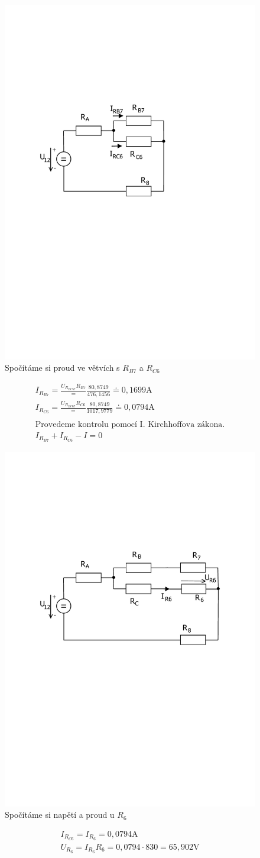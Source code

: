 	\begin{figure}[H]
		\center\includegraphics[width=0.6\linewidth]{obr/1_9}
		\caption*{Spočítáme si proud ve větvích s $R_{B7}$ a  $R_{C6}$}
	\end{figure}
	\begin{gather*}
		I_{R_{B7}} = \frac{U_{R_{BC67}}{R_{B7}}} = \frac{80,8749}{476,1456} \doteq 0,1699 \text{A} \\
		I_{R_{C6}} = \frac{U_{R_{BC67}}{R_{C6}}} = \frac{80,8749}{1017,9779} \doteq 0,0794 \text{A} \\
		\\
		\text{Provedeme kontrolu pomocí I. Kirchhoffova zákona.}  \\
		I_{R_{B7}} + I_{R_{C6}} - I  =  0 
	\end{gather*}

	\begin{figure}[H]
		\center\includegraphics[width=0.6\linewidth]{obr/1_10}
		\caption*{Spočítáme si napětí a proud u $R_6$}
	\end{figure}
	\begin{gather*}
		I_{R_{C6}} = I_{R_6} = 0,0794 \text{A} \\
		U_{R_6} = {I_{R_6} R_6} = {0,0794 \cdot 830} = 65,902  \text{V} \\
	\end{gather*}
	
	\newpage
